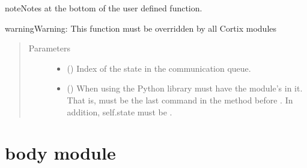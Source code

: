 \documentclass[letterpaper,10pt,openany,oneside,english]{sphinxmanual}
\begin{document}
\begin{fulllineitems}
\begin{fulllineitems}
\begin{sphinxadmonition}{note}{Notes}
at the bottom of the user defined  function.
\end{sphinxadmonition}

\begin{sphinxadmonition}{warning}{Warning:}
This function must be overridden by all Cortix modules
\end{sphinxadmonition}
\begin{quote}\begin{description}
\item[{Parameters}] \leavevmode\begin{itemize}
\item {} 
\sphinxstyleliteralstrong{\sphinxupquote{{[}}}\sphinxstyleliteralstrong{\sphinxupquote{{]}}} () \textendash{} Index of the state in the communication queue.

\item {} 
\sphinxstyleliteralstrong{\sphinxupquote{{[}}}\sphinxstyleliteralstrong{\sphinxupquote{{]}}} () \textendash{} When using the Python  library  must have
the module’s  in it. That is,
 must be the last command in the
method before . In addition, self.state must be .

\end{itemize}

\end{description}\end{quote}

\end{fulllineitems}


\end{fulllineitems}



\section{body module}
\label{\detokenize{examples_rst/body:module-body}}\label{\detokenize{examples_rst/body:body-module}}\label{\detokenize{examples_rst/body::doc}}
\end{document}
